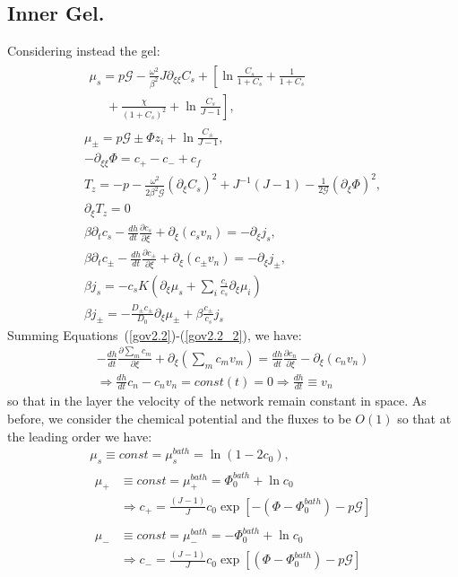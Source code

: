 \documentclass[12pt]{extarticle}
\begin{document}
\subsection{Inner Gel.}
Considering instead the gel:
\begin{gather}
\begin{aligned}
\mu_s = p \mathcal{G} - \frac{\omega^2}{\beta^2} J \partial_{\xi\xi} C_s + \left[\ln \frac{C_s}{1+C_s} + \frac{1}{1+C_s}\right.\\
\left.\ \ \ \ \ \ +\frac{\chi}{(1+C_s)^2} + \ln \frac{C_s}{J-1} \right], 
\end{aligned}\label{mus2.2}\\[2.5mm]
\mu_\pm = p \mathcal{G} \pm \Phi z_i + \ln \frac{C_\pm}{J-1} ,\\
-\partial_{\xi\xi} \Phi = c_+-c_-+c_f\,\label{Poi2.2} \\
T_z= -p-\frac{\omega^2 }{2\beta^2\mathcal{G}} (\partial_\xi C_s)^2+ J^{-1}\left(J-1\right)-\frac{1}{2\mathcal{G}} (\partial_\xi \Phi)^2,\label{T2.2}\\
\partial_\xi T_z=0\\
\beta \partial_t c_s -\frac{dh}{dt}\frac{\partial c_s}{\partial \xi}+\partial_\xi (c_s v_n)= - \partial_\xi j_s,\label{gov2.2}\\
\beta \partial_t c_\pm -\frac{dh}{dt}\frac{\partial c_\pm}{\partial \xi}+\partial_\xi (c_\pm v_n)= -\partial_\xi j_\pm,\label{gov2.2_2}\\
\beta j_s =-c_s K  \left(\partial_\xi\mu_s +\sum_i \frac{c_i}{c_s} \partial_\xi \mu_i\right)\\
\beta j_\pm= - \frac{D_\pm c_\pm}{D_0}\partial_\xi \mu_\pm + \beta \frac{c_\pm}{c_s}j_s
\end{gather}
Summing Equations~(\ref{gov2.2})-(\ref{gov2.2_2}), we have:
\begin{equation}
\begin{aligned}
-\frac{dh}{dt}\frac{\partial \sum_m c_m}{\partial \xi}+ \partial_\xi \left(\sum_m c_m v_m\right)= \frac{dh}{dt}\frac{\partial c_n}{\partial \xi}-\partial_\xi (c_n v_n)\\
\Rightarrow  \frac{dh}{dt} c_n -c_n v_n=const(t)=0 \Rightarrow  \frac{dh}{dt} \equiv v_n
\end{aligned}
\end{equation}
so that in the layer the velocity of the network remain constant in space.
As before, we consider the chemical potential and the fluxes to be $O(1)$ so that at the leading order we have:
\begin{gather}
\mu_s \equiv const = \mu^{bath}_s= \ln(1-2c_0),\\
\begin{aligned}
\mu_+ &\equiv const = \mu^{bath}_+=  \Phi_0^{bath} + \ln c_0 \\&\Rightarrow c_+=\frac{(J-1)}{J}c_0\exp[-(\Phi-\Phi_0^{bath})-p\mathcal{G}]
\end{aligned}\\
\begin{aligned}
\mu_- &\equiv const = \mu^{bath}_-= - \Phi_0^{bath} + \ln c_0\\ &\Rightarrow c_-=\frac{(J-1)}{J}c_0\exp[(\Phi-\Phi_0^{bath})-p\mathcal{G}]
\end{aligned}
\end{gather}
\end{document}
